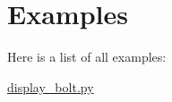 \section{Examples}
Here is a list of all examples\+:\begin{DoxyCompactItemize}
\item 
\hyperlink{display_bolt_8py-example}{display\+\_\+bolt.\+py}
\end{DoxyCompactItemize}
